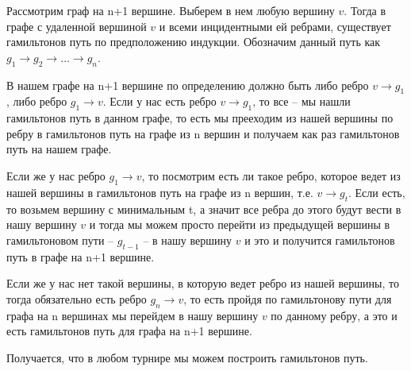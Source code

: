 	Рассмотрим граф на n+1 вершине. Выберем в нем любую вершину $v$. Тогда в графе с удаленной вершиной $v$ и всеми инцидентными ей ребрами, существует гамильтонов путь по предположению индукции. Обозначим данный путь как $g_1 \to g_2 \to \dots \to g_n$.
	
	В нашем графе на n+1 вершине по определению должно быть либо ребро $v \to g_1$, либо ребро $g_1 \to v$. Если у нас есть ребро $v \to g_1$, то все -- мы нашли гамильтонов путь в данном графе, то есть мы прееходим из нашей вершины по ребру в гамильтонов путь на графе из n вершин и получаем как раз гамильтонов путь на нашем графе.
	
	Если же у нас ребро $g_1 \to v$, то посмотрим есть ли такое ребро, которое ведет из нашей вершины в  гамильтонов путь на графе из n вершин, т.е. $v \to g_t$. Если есть, то возьмем вершину с минимальным t, а значит все ребра до этого будут вести в нашу вершину $v$ и тогда мы можем просто перейти из предыдущей вершины в гамильтоновом пути -- $g_{t-1}$ -- в нашу вершину $v$ и это и получится гамильтонов путь в графе на n+1 вершине.
	
	Если же у нас нет такой вершины, в которую ведет ребро из нашей вершины, то тогда обязательно есть ребро $g_n \to v$, то есть пройдя по гамильтонову пути для графа на n вершинах мы перейдем в нашу вершину $v$ по данному ребру, а это и есть гамильтонов путь для графа на n+1 вершине. 
	
	Получается, что в любом турнире мы можем построить гамильтонов путь. 
	
	
	